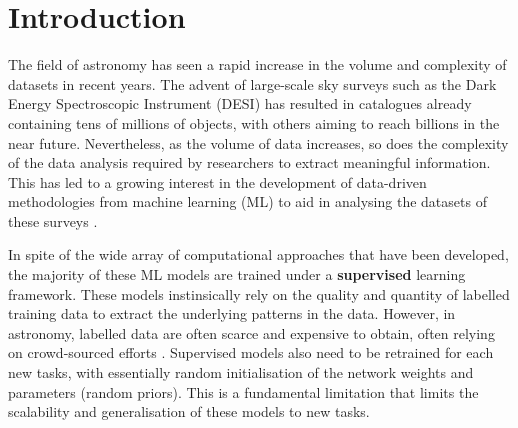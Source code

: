 \documentclass[a4paper,12pt]{article}
\begin{document}


\section{Introduction}


The field of astronomy has seen a rapid increase in the volume and complexity of datasets in recent years. The advent of large-scale sky surveys such as the Dark Energy Spectroscopic Instrument (DESI) \cite{DESI} has resulted in catalogues already containing tens of millions of objects, with others aiming to reach billions in the near future. Nevertheless, as the volume of data increases, so does the complexity of the data analysis required by researchers to extract meaningful information. This has led to a growing interest in the development of data-driven methodologies from machine learning (ML) to aid in analysing the datasets of these surveys \cite{ivezic2020statistics}. 

In spite of the wide array of computational approaches that have been developed, the majority of these ML models are trained under a \textbf{supervised} learning framework. These models instinsically rely on the quality and quantity of labelled training data to extract the underlying patterns in the data. However, in astronomy, labelled data are often scarce and expensive to obtain, often relying on crowd-sourced efforts \cite{willett2013galaxy}. Supervised models also need to be retrained for each new tasks, with essentially random initialisation of the network weights and parameters (random priors). This is a fundamental limitation that limits the scalability and generalisation of these models to new tasks.
\end{document}
